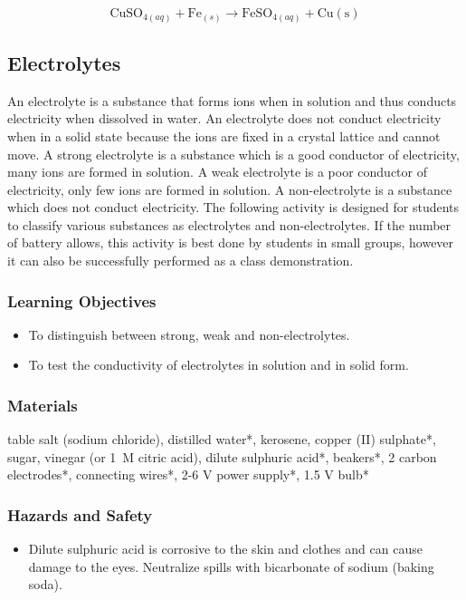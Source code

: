 $$ \mathrm{CuSO}_{4(aq)} + \mathrm{Fe}_{(s)} \longrightarrow \mathrm{FeSO}_{4(aq)} + \mathrm{Cu(s)} $$

\subsection{Electrolytes}

An electrolyte is a substance that forms ions when in solution and thus conducts electricity when dissolved in water. An electrolyte does not conduct electricity when in a solid state because the ions are fixed in a crystal lattice and cannot move.  A strong electrolyte is a substance which is a good conductor of electricity, many ions are formed in solution. A weak electrolyte is a poor conductor of electricity, only few ions are formed in solution. A non-electrolyte is a substance which does not conduct electricity. The following activity is designed for students to classify various substances as electrolytes and non-electrolytes. If the number of battery allows, this activity is best done by students in small groups, however it can also be successfully performed as a class demonstration.

\subsubsection*{Learning Objectives}
\begin{itemize}
\item{To distinguish between strong, weak and non-electrolytes.}
\item{To test the conductivity of electrolytes in solution and in solid form.}
\end{itemize}

\subsubsection*{Materials}
table salt (sodium chloride), distilled water*, kerosene, copper (II) sulphate*, sugar, vinegar (or 1~M citric acid), dilute sulphuric acid*, beakers*, 2 carbon electrodes*, connecting wires*, 2-6 V power supply*, 1.5 V bulb*

\subsubsection*{Hazards and Safety}
\begin{itemize}
\item{Dilute sulphuric acid is corrosive to the skin and clothes and can cause damage to the eyes. Neutralize spills with bicarbonate of sodium (baking soda).}
\end{itemize}

